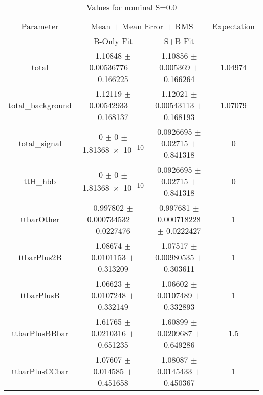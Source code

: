 \begin{table}
\centering
\caption{Values for nominal S=0.0}
\begin{tabular}{cccc}
\toprule
Parameter & \multicolumn{2}{c}{Mean $\pm$ Mean Error $\pm$ RMS} & Expectation\\
 & B-Only Fit & S+B Fit & \\
\midrule
total & \num{1.10848} $\pm$ \num{0.00536776} $\pm$ \num{0.166225} & \num{1.10856} $\pm$ \num{0.005369} $\pm$ \num{0.166264} & \num{1.04974}\\
total\_background & \num{1.12119} $\pm$ \num{0.00542933} $\pm$ \num{0.168137} & \num{1.12021} $\pm$ \num{0.00543113} $\pm$ \num{0.168193} & \num{1.07079}\\
total\_signal & \num{0} $\pm$ \num{0} $\pm$ \num{1.81368e-10} & \num{0.0926695} $\pm$ \num{0.02715} $\pm$ \num{0.841318} & \num{0}\\
ttH\_hbb & \num{0} $\pm$ \num{0} $\pm$ \num{1.81368e-10} & \num{0.0926695} $\pm$ \num{0.02715} $\pm$ \num{0.841318} & \num{0}\\
ttbarOther & \num{0.997802} $\pm$ \num{0.000734532} $\pm$ \num{0.0227476} & \num{0.997681} $\pm$ \num{0.000718228} $\pm$ \num{0.0222427} & \num{1}\\
ttbarPlus2B & \num{1.08674} $\pm$ \num{0.0101153} $\pm$ \num{0.313209} & \num{1.07517} $\pm$ \num{0.00980535} $\pm$ \num{0.303611} & \num{1}\\
ttbarPlusB & \num{1.06623} $\pm$ \num{0.0107248} $\pm$ \num{0.332149} & \num{1.06602} $\pm$ \num{0.0107489} $\pm$ \num{0.332893} & \num{1}\\
ttbarPlusBBbar & \num{1.61765} $\pm$ \num{0.0210316} $\pm$ \num{0.651235} & \num{1.60899} $\pm$ \num{0.0209687} $\pm$ \num{0.649286} & \num{1.5}\\
ttbarPlusCCbar & \num{1.07607} $\pm$ \num{0.014585} $\pm$ \num{0.451658} & \num{1.08087} $\pm$ \num{0.0145433} $\pm$ \num{0.450367} & \num{1}\\
\bottomrule
\end{tabular}
\end{table}